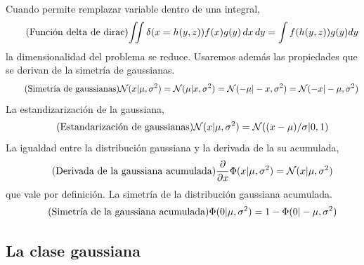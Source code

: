 \documentclass[a4paper,11pt]{book}
\newcommand{\N}{\mathcal{N}}
\theoremstyle{definition}
\begin{document}
%
Cuando permite remplazar variable dentro de una integral,
%
\begin{equation*}\label{eq:integral_con_dirac} \tag{\text{Funci\'on delta de dirac}}
\begin{split}
 \iint  \delta(x=h(y,z)) f(x) g(y)\, dx\, dy = \int f(h(y,z)) g(y) dy
 \end{split}
\end{equation*}
%
la dimensionalidad del problema se reduce.
%
Usaremos además las propiedades que se derivan de la simetría de gaussianas.
%
\begin{equation*}\label{eq:simetria} \tag{\text{Simetría de gaussianas}}
 \N(x|\mu,\sigma^2) = \N(\mu|x,\sigma^2) = \N(-\mu|-x,\sigma^2) = \N(-x|-\mu,\sigma^2)
\end{equation*}
%
La estandizarizaci\'on de la gaussiana,
\begin{equation*}\label{eq:estandarizar} \tag{\text{Estandarizaci\'on de gaussianas}}
  \N(x|\mu,\sigma^2) = \N((x-\mu)/\sigma | 0, 1)
\end{equation*}
%
La igualdad entre la distribuci\'on gaussiana y la derivada de la su acumulada,
\begin{equation*}\label{eq:phi_norm} \tag{\text{Derivada de la gaussiana acumulada}}
 \frac{\partial}{\partial x} \Phi(x|\mu,\sigma^2) = \N(x|\mu,\sigma^2)
\end{equation*}
%
que vale por definici\'on.
%
La simetría de la distribuci\'on gaussiana acumulada.
\begin{equation*}\label{eq:phi_simetria} \tag{\text{Simetría de la gaussiana acumulada}}
\Phi(0|\mu,\sigma^2) = 1-\Phi(0|-\mu,\sigma^2)
\end{equation*}

\subsection{La clase gaussiana}\label{sec:Gaussian}
\end{document}
